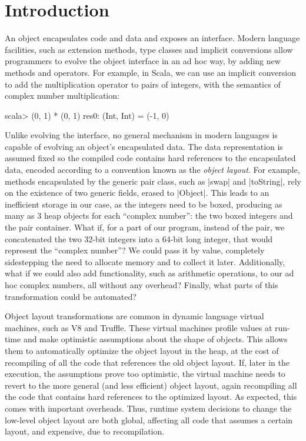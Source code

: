 \section{Introduction}
\label{sec:intro}

An object encapsulates code and data and exposes an interface. Modern
language facilities, such as extension methods, type classes and
implicit conversions allow programmers to evolve the object interface
in an ad hoc way, by adding new methods and operators. For example, in
Scala, we can use an implicit conversion to add the multiplication
operator to pairs of integers, with the semantics of complex number
multiplication:

\begin{lstlisting-nobreak}
scala> (0, 1) * (0, 1)
res0: (Int, Int) = (-1, 0)
\end{lstlisting-nobreak}

Unlike evolving the interface, no general mechanism in modern
languages is capable of evolving an object's encapsulated data. The
data representation is assumed fixed so the compiled code contains hard
references to the encapsulated data, encoded according to a convention
known as the \emph{object layout}. For example, methods encapsulated
by the generic pair class, such as |swap| and |toString|, rely on the
existence of two generic fields, erased to |Object|. This leads to
an inefficient storage in our case, as the integers need to be boxed, producing as many as
3 heap objects for each ``complex number'': the two boxed integers and
the pair container. What if, for a part of  our program, instead of the pair, we
concatenated the two 32-bit integers into a 64-bit long integer, that
would represent the ``complex number''? We could pass it by value,
completely sidestepping the need to allocate memory and to collect it
later. Additionally, what if we could also add
functionality, such as arithmetic operations, to our ad hoc complex
numbers, all without any overhead? Finally, what parts of this
transformation could be automated? %

Object layout transformations are common in dynamic language virtual
machines, such as V8 and Truffle. These virtual machines profile
values at run-time and make optimistic assumptions about the shape of
objects. This allows them to automatically optimize the object layout
in the heap, at the cost of recompiling of all the code that references
 the old object layout.
If, later in the execution, the assumptions prove too optimistic, the
virtual machine needs to revert to the more general (and less
efficient) object layout, again recompiling all the code that contains
hard references to the optimized layout. As expected, this comes with
important overheads. Thus, runtime system decisions to change the
low-level object layout are both global, affecting all code that
assumes a certain layout, and expensive, due to recompilation.

